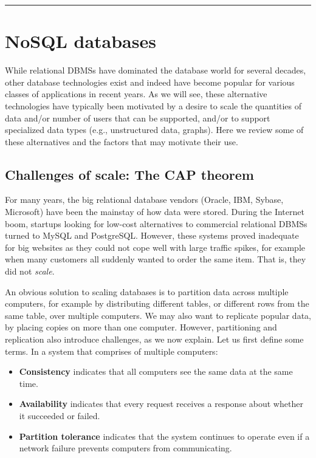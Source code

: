 \documentclass[]{krantz}
\begin{document}
\begin{center}\rule{0.5\linewidth}{\linethickness}\end{center}

\hypertarget{sec:db:nosql}{\section{NoSQL
databases}\label{sec:db:nosql}}

While relational DBMSs have dominated the database world for several
decades, other database technologies exist and indeed have become
popular for various classes of applications in recent years. As we will
see, these alternative technologies have typically been motivated by a
desire to scale the quantities of data and/or number of users that can
be supported, and/or to support specialized data types (e.g.,
unstructured data, graphs). Here we review some of these alternatives
and the factors that may motivate their use.

\subsection{Challenges of scale: The CAP
theorem}\label{challenges-of-scale-the-cap-theorem}

For many years, the big relational database vendors (Oracle, IBM,
Sybase, Microsoft) have been the mainstay of how data were stored.
During the Internet boom, startups looking for low-cost alternatives to
commercial relational DBMSs turned to MySQL and PostgreSQL. However,
these systems proved inadequate for big websites as they could not cope
well with large traffic spikes, for example when many customers all
suddenly wanted to order the same item. That is, they did not
\emph{scale}.

An obvious solution to scaling databases is to partition data across
multiple computers, for example by distributing different tables, or
different rows from the same table, over multiple computers. We may also
want to replicate popular data, by placing copies on more than one
computer. However, partitioning and replication also introduce
challenges, as we now explain. Let us first define some terms. In a
system that comprises of multiple computers:

\begin{itemize}
\item
  \textbf{Consistency} indicates that all computers see the same data at
  the same time.
\item
  \textbf{Availability} indicates that every request receives a response
  about whether it succeeded or failed.
\item
  \textbf{Partition tolerance} indicates that the system continues to
  operate even if a network failure prevents computers from
  communicating.
\end{itemize}
\end{document}
